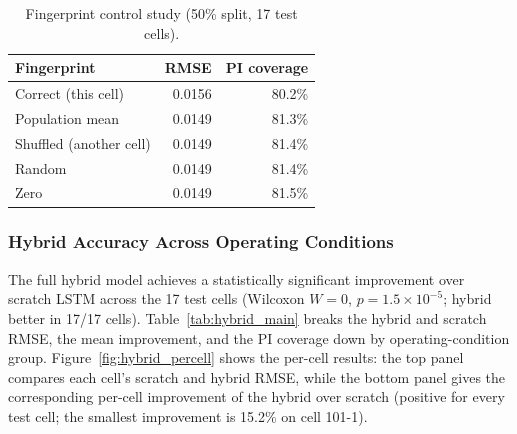 \begin{table}[pos=htbp]
\centering
\caption{Fingerprint control study (50\% split, 17 test cells).}\label{tab:fp}
\small
\begin{tabular*}{\columnwidth}{@{\extracolsep{\fill}}lrr}
\toprule
Fingerprint & RMSE & PI coverage \\
\midrule
Correct (this cell)      & 0.0156 & 80.2\% \\
Population mean          & 0.0149 & 81.3\% \\
Shuffled (another cell)  & 0.0149 & 81.4\% \\
Random                   & 0.0149 & 81.4\% \\
Zero                     & 0.0149 & 81.5\% \\
\bottomrule
\end{tabular*}
\end{table}

\subsubsection{Hybrid Accuracy Across Operating Conditions}

\begin{table}[pos=htbp]
\caption{Full hybrid results by operating-condition group (50\% split).}
\label{tab:hybrid_main}
\end{table}

The full hybrid model achieves a statistically significant improvement over
scratch LSTM across the 17 test cells (Wilcoxon $W=0$, $p=1.5\times10^{-5}$;
hybrid better in 17/17 cells).
Table~\ref{tab:hybrid_main} breaks the hybrid and scratch RMSE, the mean
improvement, and the PI coverage down by operating-condition group.
Figure~\ref{fig:hybrid_percell} shows the per-cell results: the top panel
compares each cell's scratch and hybrid RMSE, while the bottom panel gives the
corresponding per-cell improvement of the hybrid over scratch (positive for
every test cell; the smallest improvement is 15.2\% on cell 101-1).

